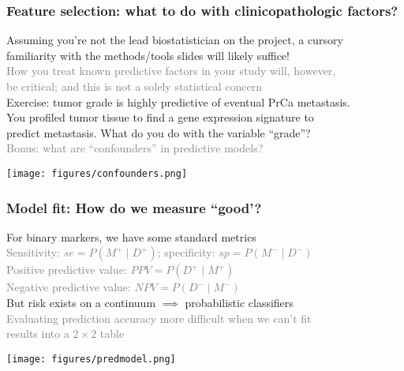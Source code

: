 \documentclass{beamer}
\newcommand{\si}[1]{\hspace{.5cm} \textcolor{gray} {#1}\\}
\newcommand{\sicont}[1]{\hspace{1cm} \textcolor{gray} {#1}\\}
\begin{document}
{\begin{frame}[t]
\frametitle{Feature selection: what to do with clinicopathologic factors?}
Assuming you're not the lead biostatistician on the project, a cursory\\
\hspace{.5cm} familiarity with the methods/tools slides will likely suffice!\\
\si{How you treat known predictive factors in your study will, however,}
\sicont{be critical; and this is not a solely statistical concern}
\vspace{.2cm}
Exercise: tumor grade is highly predictive of eventual PrCa metastasis.\\
\hspace{.5cm} You profiled tumor tissue to find a gene expression signature to\\
\hspace{.5cm} predict metastasis. What do you do with the variable ``grade''?\\
\si{Bonus: what are ``confounders'' in predictive models?}
\begin{center}
\texttt{[image: figures/confounders.png]}
\end{center}
\end{frame}

\begin{frame}[t]
\frametitle{Model fit: How do we measure ``good'?}
For binary markers, we have some standard metrics\\
\si{Sensitivity: $se=P(M^+\mid D^+)$; specificity: $sp=P(M^-\mid D^-)$}
\si{Positive predictive value: $PPV=P(D^+\mid M^+)$}
\si{Negative predictive value: $NPV=P(D^-\mid M^-)$}
\vspace{.2cm}
But risk exists on a continuum $\implies$ probabilistic classifiers\\
\si{Evaluating prediction accuracy more difficult when we can't fit}
\sicont{results into a $2\times 2$ table}
\begin{center}
\texttt{[image: figures/predmodel.png]}
\end{center}
\end{frame}


}
\end{document}
